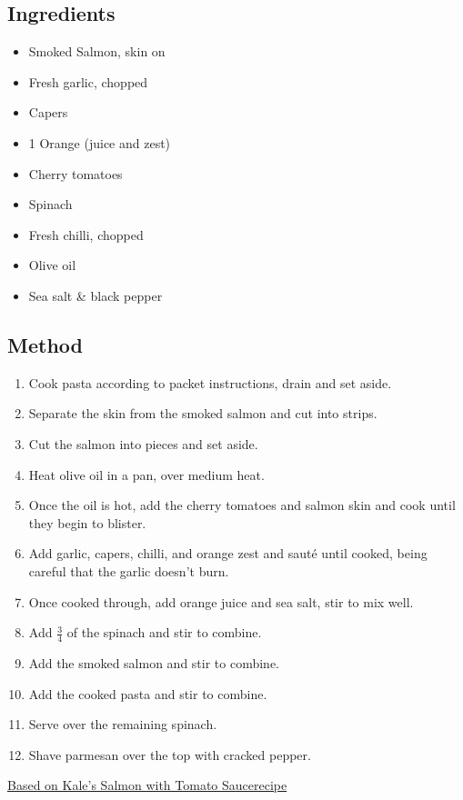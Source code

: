 \documentclass[11pt,a4paper]{article}
\begin{document}
\subsection*{Ingredients}

\begin{itemize}
  \item Smoked Salmon, skin on
  \item Fresh garlic, chopped
  \item Capers
  \item 1 Orange (juice and zest)
  \item Cherry tomatoes
  \item Spinach
  \item Fresh chilli, chopped
  \item Olive oil
  \item Sea salt \& black pepper
\end{itemize}

\medskip

\subsection*{Method}

\begin{enumerate}
  \item Cook pasta according to packet instructions, drain and set aside.
  \item Separate the skin from the smoked salmon and cut into strips.
  \item Cut the salmon into pieces and set aside.
  \item Heat olive oil in a pan, over medium heat.
  \item Once the oil is hot, add the cherry tomatoes and salmon skin and cook until they begin to blister.
  \item Add garlic, capers, chilli, and orange zest and saut\'{e} until cooked, being careful that the garlic doesn't burn.
  \item Once cooked through, add orange juice and sea salt, stir to mix well.
  \item Add $\frac {3} {4}$ of the spinach and stir to combine.
  \item Add the smoked salmon and stir to combine.
  \item Add the cooked pasta and stir to combine.
  \item Serve over the remaining spinach.
  \item Shave parmesan over the top with cracked pepper.
\end{enumerate}

\href{https://kalejunkie.com/quick-easy-salmon-with-tomato-lemon-sauce/}{Based on Kale's Salmon with Tomato Saucerecipe}
\end{document}
